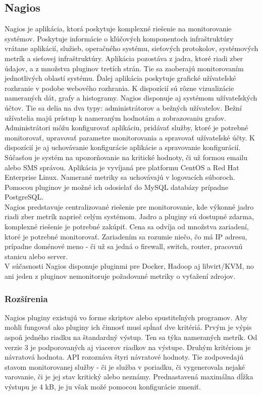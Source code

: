 \documentclass[printed,11pt,twoside,color,cover,table]{fithesis3}
\begin{document}
\subsection{Nagios}
Nagios je aplikácia, ktorá poskytuje komplexné riešenie na monitorovanie systémov. Poskytuje informácie o kľúčových komponentoch infraštruktúry vrátane aplikácií, služieb, operačného systému, 
sieťových protokolov, systémových metrík a sieťovej infraštruktúry. \cite{nagios} 
Aplikácia pozostáva z jadra, ktoré riadi zber údajov, a z množstva pluginov tretích strán. Tie sa zaoberajú monitorovaním jednotlivých oblastí systému. Ďalej aplikácia
poskytuje grafické užívateľské rozhranie v podobe webového rozhrania. K dispozícií sú rôzne vizualizácie nameraných dát, grafy a histogramy. Nagios disponuje aj systémom užívateľských účtov. Tie sa delia 
na dva typy: 
administrátorov a bežných užívateľov. Bežní užívatelia majú prístup k nameraným hodnotám a zobrazovaniu grafov. Administrátori môžu konfigurovať aplikáciu, pridávať služby, ktoré je potrebné monitorovať,
upravovať parametre monitorovania a spravovať užívateľské účty. K dispozícií je aj uchovávanie konfigurácie aplikácie a spravovanie konfigurácií. Súčasťou je systém na upozorňovanie na kritické
hodnoty, či už formou emailu alebo SMS správou. Aplikácia je vyvíjaná pre platformu CentOS a Red Hat Enterprise Linux. Namerané metriky sa uchovávajú v logovacích súboroch. 
Pomocou pluginov je možné ich odosielať do MySQL databázy prípadne PostgreSQL. 
\\Nagios predstavuje centralizované riešenie pre  monitorovanie, kde výkonné jadro riadi zber metrík naprieč celým systémom. 
Jadro a pluginy sú dostupné zdarma, komplexné riešenie je potrebné zakúpiť. Cena sa odvíja od množstva zariadení, ktoré je potrebné monitorovať. Zariadením sa rozumie niečo, čo má IP adresu, 
prípadne doménové meno - či už sa jedná o firewall, switch, router, pracovnú stanicu alebo server. 
\\V súčasnosti Nagios disponuje pluginmi pre Docker, Hadoop aj libvirt/KVM, no ani jeden z pluginov nemonitoruje požadované metriky o vyťažení zdrojov.

\subsubsection{Rozšírenia}
Nagios pluginy existujú vo forme skriptov alebo spustiteľných programov. Aby mohli fungovať ako pluginy ich činnosť musí spĺnať dve kritériá. Prvým je výpis aspoň jedného riadku na štandardný výstup.
Ten sa týka nameraných metrík. Od verzie 3 je podporovaných aj viacerov riadkov na výstupe. Druhým kritériom je návratová hodnota.
API rozoznáva štyri návratové hodnoty. Tie zodpovedajú stavom monitorovanej služby - či je služba v poriadku, či vygenerovala nejaké varovanie, či je jej stav kritický alebo neznámy. Prednastavená maximálna 
dĺžka výstupu je 4 kB, je ju však možé pomocou konfigurácie zmeniť.
\end{document}
